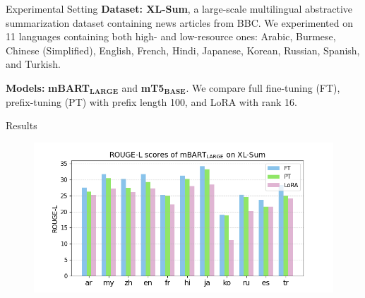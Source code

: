 \documentclass[final]{beamer}
\newlength{\colwidth}
\begin{document}
\begin{frame}[t]
\begin{columns}[t]
\begin{column}{\colwidth}
\begin{block}{Experimental Setting}
    \textbf{Dataset: XL-Sum}, a large-scale multilingual abstractive summarization dataset containing news articles from BBC.
    We experimented on 11 languages containing both high- and low-resource ones: Arabic, Burmese, Chinese (Simplified), English, French, Hindi, Japanese, Korean, Russian, Spanish, and Turkish.

    \begin{table}
      \centering
    \end{table}

    \textbf{Models:} \textbf{mBART}$_{\textbf{LARGE}}$ and \textbf{mT5}$_{\textbf{BASE}}$. We compare full fine-tuning (FT), prefix-tuning (PT) with prefix length 100, and LoRA with rank 16.


  \end{block}


  \begin{block}{Results}
    \begin{figure}
    \centering
    \includegraphics[width=\textwidth]{fig/mbart-result.png}
    \end{figure}


\end{block}
\end{column}
\end{columns}
\end{frame}
\end{document}
